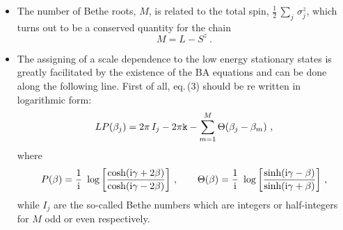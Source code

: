 \documentclass[12pt]{article}
\def\bea{\begin{eqnarray}}
\def\eea{\end{eqnarray}}
\def\be{\begin{equation}}
\def\ee{\end{equation}}
\def\be{\begin{equation}}
\def\ee{\end{equation}}
\def\bea{\begin{eqnarray}}
\def\eea{\end{eqnarray}}
\def\ri{{\rm i}}
\begin{document}
\begin{itemize}
\item
The number of Bethe roots, $M$,  is related to the total spin,
$\frac{1}{2}\,\sum_j\,\sigma^z_j$, which turns out to be a conserved quantity 
for the chain
\be
M=L-S^z\ .
\ee

\item
The assigning of a scale dependence to the low energy stationary states is greatly facilitated by the existence of the BA equations and can be done along the following line. First of all, eq.\,(3) should be re written in logarithmic form:
\bea
L P(\beta_j)=2\pi\, I_j-2\pi{\tt k}-\sum_{m=1}^M \Theta(\beta_j-\beta_m)\ ,
\eea
where
\bea
P(\beta)=\frac{1}{\ri}\ \log\bigg[\frac{\cosh(\ri\gamma+2\beta)}{\cosh(\ri\gamma-2\beta)}\bigg] \ , \qquad 
\Theta(\beta)=\frac{1}{\ri}\ \log\bigg[\frac{\sinh(\ri\gamma-\beta)}{\sinh(\ri\gamma+\beta)}\bigg]\ ,
\eea
while $I_j$ are the so-called Bethe numbers which are integers or half-integers for $M$ odd or even respectively. 


\end{itemize}
\end{document}
